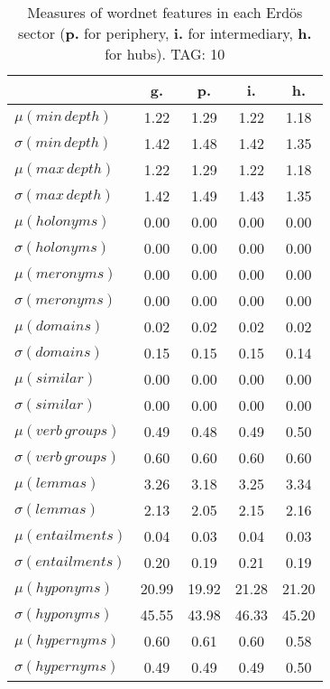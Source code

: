\begin{table}[h!]
\begin{center}
\begin{tabular}{| l | c | c | c | c |}\hline
 & g. & p. & i. & h. \\\hline
$\mu(min\,depth)$ & 1.22  & 1.29  & 1.22  & 1.18 \\\hline
$\sigma(min\,depth)$ & 1.42  & 1.48  & 1.42  & 1.35 \\\hline
$\mu(max\,depth)$ & 1.22  & 1.29  & 1.22  & 1.18 \\\hline
$\sigma(max\,depth)$ & 1.42  & 1.49  & 1.43  & 1.35 \\\hline
$\mu(holonyms)$ & 0.00  & 0.00  & 0.00  & 0.00 \\\hline
$\sigma(holonyms)$ & 0.00  & 0.00  & 0.00  & 0.00 \\\hline
$\mu(meronyms)$ & 0.00  & 0.00  & 0.00  & 0.00 \\\hline
$\sigma(meronyms)$ & 0.00  & 0.00  & 0.00  & 0.00 \\\hline
$\mu(domains)$ & 0.02  & 0.02  & 0.02  & 0.02 \\\hline
$\sigma(domains)$ & 0.15  & 0.15  & 0.15  & 0.14 \\\hline
$\mu(similar)$ & 0.00  & 0.00  & 0.00  & 0.00 \\\hline
$\sigma(similar)$ & 0.00  & 0.00  & 0.00  & 0.00 \\\hline
$\mu(verb\,groups)$ & 0.49  & 0.48  & 0.49  & 0.50 \\\hline
$\sigma(verb\,groups)$ & 0.60  & 0.60  & 0.60  & 0.60 \\\hline
$\mu(lemmas)$ & 3.26  & 3.18  & 3.25  & 3.34 \\\hline
$\sigma(lemmas)$ & 2.13  & 2.05  & 2.15  & 2.16 \\\hline
$\mu(entailments)$ & 0.04  & 0.03  & 0.04  & 0.03 \\\hline
$\sigma(entailments)$ & 0.20  & 0.19  & 0.21  & 0.19 \\\hline
$\mu(hyponyms)$ & 20.99  & 19.92  & 21.28  & 21.20 \\\hline
$\sigma(hyponyms)$ & 45.55  & 43.98  & 46.33  & 45.20 \\\hline
$\mu(hypernyms)$ & 0.60  & 0.61  & 0.60  & 0.58 \\\hline
$\sigma(hypernyms)$ & 0.49  & 0.49  & 0.49  & 0.50 \\\hline
\end{tabular}
\caption{Measures of wordnet features in each Erd\"os sector ({{\bf p.}} for periphery, {{\bf i.}} for intermediary, {{\bf h.}} for hubs). TAG: 10}
\end{center}
\end{table}